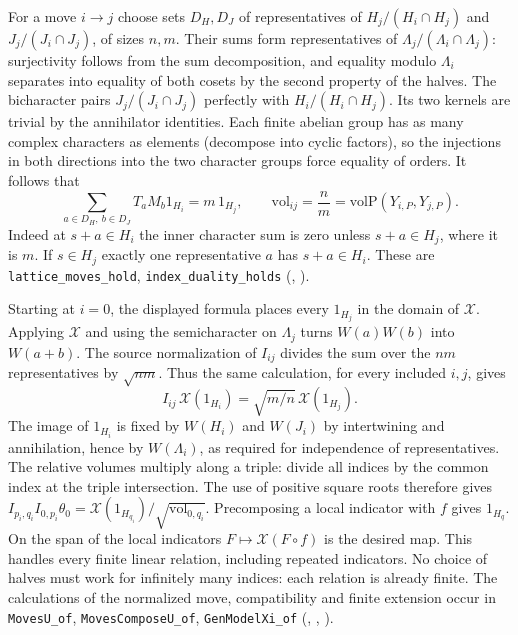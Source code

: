For a move \(i\to j\) choose sets \(D_H,D_J\) of representatives of
\(H_j/(H_i\cap H_j)\) and \(J_j/(J_i\cap J_j)\), of sizes \(n,m\).
Their sums form representatives of
\(\Lambda_j/(\Lambda_i\cap\Lambda_j)\): surjectivity follows from
the sum decomposition, and equality modulo \(\Lambda_i\) separates
into equality of both cosets by the second property of the halves.
The bicharacter pairs \(J_j/(J_i\cap J_j)\) perfectly with
\(H_i/(H_i\cap H_j)\). Its two kernels are trivial by the annihilator
identities. Each finite abelian group has as many complex characters
as elements (decompose into cyclic factors), so the injections
in both directions into the two character groups force equality of
orders. It follows that
\[
 \sum_{a\in D_H,\ b\in D_J}T_aM_b1_{H_i}=m\,1_{H_j},
 \qquad
 \mathrm{vol}_{ij}=\frac{n}{m}
 =\mathrm{volP}(Y_{i,P},Y_{j,P}).
\]
Indeed at \(s+a\in H_i\) the inner character sum is zero unless
\(s+a\in H_j\), where it is \(m\). If \(s\in H_j\) exactly one
representative \(a\) has \(s+a\in H_i\). These are
\nolinkurl{lattice_moves_hold}, \nolinkurl{index_duality_holds}
(,
).

Starting at \(i=0\), the displayed formula places every \(1_{H_j}\)
in the domain of \(\mathcal X\). Applying \(\mathcal X\) and using the
semicharacter on \(\Lambda_j\) turns \(W(a)W(b)\) into \(W(a+b)\).
The source normalization of \(I_{ij}\) divides the sum over the \(nm\)
representatives by \(\sqrt{nm}\). Thus the same calculation, for every
included \(i,j\), gives
\[
 I_{ij}\,\mathcal X(1_{H_i})
   =\sqrt{m/n}\,\mathcal X(1_{H_j}).
\]
The image of \(1_{H_i}\) is fixed by \(W(H_i)\) and \(W(J_i)\) by
intertwining and annihilation, hence by \(W(\Lambda_i)\), as required
for independence of representatives. The relative volumes multiply
along a triple: divide all indices by the common index at the triple
intersection. The use of positive square roots therefore gives
\(I_{p_i,q_i}I_{0,p_i}\theta_0
=\mathcal X(1_{H_{q_i}})/\sqrt{\mathrm{vol}_{0,q_i}}\).
Precomposing a local indicator with \(f\) gives \(1_{H_q}\).
On the span of the local indicators \(F\mapsto\mathcal X(F\circ f)\)
is the desired map. This handles every finite linear relation, including
repeated indicators. No choice of halves must work for infinitely many
indices: each relation is already finite. The calculations of the
normalized move, compatibility and finite extension occur in
\nolinkurl{MovesU_of}, \nolinkurl{MovesComposeU_of}, \nolinkurl{GenModelXi_of}
(,
,
).

